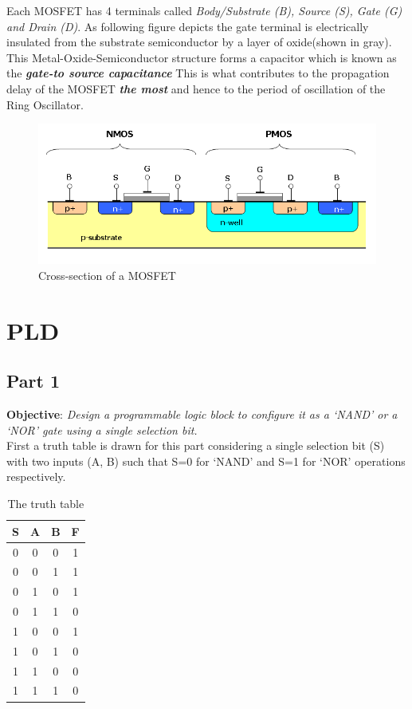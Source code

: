 \documentclass[a4paper,11pt]{article}%
\begin{document}
Each MOSFET has 4 terminals called \textit{Body/Substrate (B), Source (S), Gate (G) and Drain (D)}. As following figure depicts the gate terminal is electrically insulated from the substrate semiconductor by a layer of oxide(shown in gray). This Metal-Oxide-Semiconductor structure forms a capacitor which is known as the \textbf{\textit{gate-to source capacitance}} This is what contributes to the propagation delay of the MOSFET \textit{\textbf{the most}} and hence to the period of oscillation of the Ring Oscillator.

\begin{figure}[H]
	\centering
	\includegraphics[scale=0.5]{figures/Cmos_impurity_profile.png}
	\caption{Cross-section of a MOSFET\cite{mosfet}}
\end{figure}

\pagebreak
\section{PLD}
\subsection{Part 1}
\textbf{Objective}: \textit{Design a programmable logic block to configure it as a `NAND' or a `NOR' gate using a single selection bit.}\\

First a truth table is drawn for this part considering a single selection bit (S) with two inputs (A, B) such that S=0 for ‘NAND’ and S=1 for ‘NOR’ operations respectively.
\begin{table}[H]
	\centering
	\begin{tabular}{|c |c| c| c|}
		\hline
		S & A & B & F \\\hline
		0 & 0 & 0 & 1 \\
		0 & 0 & 1 & 1 \\
		0 & 1 & 0 & 1 \\
		0 & 1 & 1 & 0 \\\hline
		1 & 0 & 0 & 1 \\
		1 & 0 & 1 & 0 \\
		1 & 1 & 0 & 0 \\
		1 & 1 & 1 & 0 \\\hline\hline
	\end{tabular}
\caption{The truth table}
\end{table}
\end{document}
